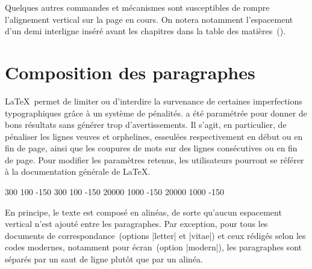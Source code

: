 \begin{noprint}
\raggedbottom
\end{noprint}

Quelques autres commandes et mécanismes sont susceptibles de rompre l'alignement vertical sur la page en cours. On notera notamment l'espacement d'un demi interligne inséré avant les chapitres dans la table des matières~(\pageref{grid:cftbeforechapterskip}).



\section{Composition des paragraphes}

\LaTeX\ permet de limiter ou d'interdire la survenance de certaines imperfections typographiques grâce à un système de pénalités. \frenchlaw a été paramétrée pour donner de bons résultats sans générer trop d'avertissements. Il s'agit, en particulier, de pénaliser les lignes veuves et orphelines, esseulées respectivement en début ou en fin de page, ainsi que les coupures de mots sur des lignes consécutives ou en fin de page. Pour modifier les paramètres retenus, les utilisateurs pourront se référer à la documentation générale de \LaTeX.

\begin{noprint}
\if@twocolumn
	 300 100 -150 %
	 300 100 -150 %
\else
	 20000 1000 -150 %
	 20000 1000 -150 %
\fi
{} %
\end{noprint}

En principe, le texte est composé en alinéas, de sorte qu'aucun espacement vertical n'est ajouté entre les paragraphes. Par exception, pour tous les documents de correspondance~(options |letter| et |vitae|) et ceux rédigés selon les codes modernes, notamment pour écran~(option |modern|), les paragraphes sont séparés par un saut de ligne plutôt que par un alinéa.

